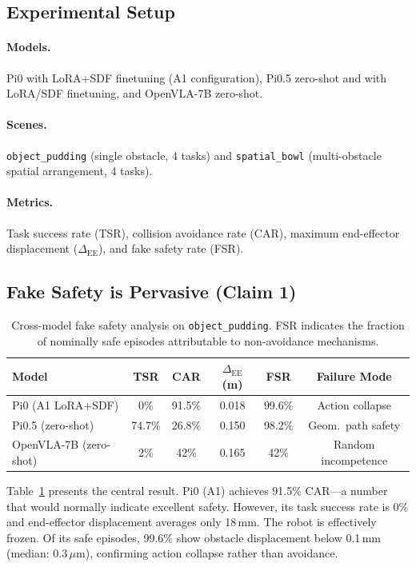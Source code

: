 \documentclass[letterpaper]{article}
\begin{document}
\subsection{Experimental Setup}

\paragraph{Models.} Pi0 with LoRA+SDF finetuning (A1 configuration), Pi0.5 zero-shot and with LoRA/SDF finetuning, and OpenVLA-7B zero-shot.

\paragraph{Scenes.} \texttt{object\_pudding} (single obstacle, 4 tasks) and \texttt{spatial\_bowl} (multi-obstacle spatial arrangement, 4 tasks).

\paragraph{Metrics.} Task success rate (TSR), collision avoidance rate (CAR), maximum end-effector displacement ($\Delta_{\text{EE}}$), and fake safety rate (FSR).

\subsection{Fake Safety is Pervasive (Claim 1)}
\label{sec:exp_fake}

\begin{table}[t]
\centering
\caption{Cross-model fake safety analysis on \texttt{object\_pudding}. FSR indicates the fraction of nominally safe episodes attributable to non-avoidance mechanisms.}
\label{tab:fake_safety}
\begin{tabular}{lccccc}
\toprule
Model & TSR & CAR & $\Delta_{\text{EE}}$ (m) & FSR & Failure Mode \\
\midrule
Pi0 (A1 LoRA+SDF) & 0\% & 91.5\% & 0.018 & 99.6\% & Action collapse \\
Pi0.5 (zero-shot) & 74.7\% & 26.8\% & 0.150 & 98.2\% & Geom.\ path safety \\
OpenVLA-7B (zero-shot) & 2\% & 42\% & 0.165 & 42\% & Random incompetence \\
\bottomrule
\end{tabular}
\end{table}

Table~\ref{tab:fake_safety} presents the central result. Pi0 (A1) achieves 91.5\% CAR---a number that would normally indicate excellent safety. However, its task success rate is 0\% and end-effector displacement averages only 18\,mm. The robot is effectively frozen. Of its safe episodes, 99.6\% show obstacle displacement below 0.1\,mm (median: 0.3\,$\mu$m), confirming action collapse rather than avoidance.
\end{document}

